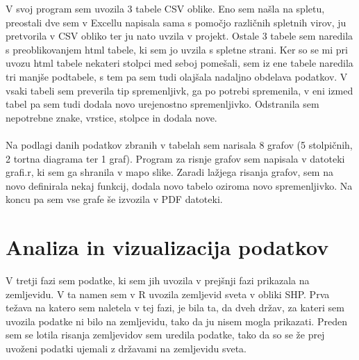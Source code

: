 \documentclass[11pt,a4paper]{article}
\begin{document}
V svoj program sem uvozila 3 tabele CSV oblike. Eno sem našla na spletu, preostali dve sem v Excellu napisala sama s pomočjo različnih spletnih virov, ju pretvorila v CSV obliko ter ju nato uvzila v projekt. Ostale 3 tabele sem naredila s preoblikovanjem html tabele, ki sem jo uvzila s spletne strani. Ker so se mi pri uvozu html tabele nekateri stolpci med seboj pomešali, sem iz ene tabele naredila tri manjše podtabele, s tem pa sem tudi olajšala nadaljno obdelava podatkov. V vsaki tabeli sem preverila tip spremenljivk, ga po potrebi spremenila, v eni izmed tabel pa sem tudi dodala novo urejenostno spremenljivko. Odstranila sem nepotrebne znake, vrstice, stolpce in dodala nove. \\
\\
Na podlagi danih podatkov zbranih v tabelah sem narisala 8 grafov (5 stolpičnih, 2 tortna diagrama ter 1 graf).
Program za risnje grafov sem napisala v datoteki grafi.r, ki sem ga shranila v mapo slike. Zaradi lažjega risanja grafov, sem na novo definirala nekaj funkcij, dodala novo tabelo oziroma novo spremenljivko.
Na koncu pa sem vse grafe še izvozila v PDF datoteki.



\newpage

\section{Analiza in vizualizacija podatkov}

V tretji fazi sem podatke, ki sem jih uvozila v prejšnji fazi prikazala na zemljevidu.
V ta namen sem v R uvozila zemljevid sveta v obliki SHP.
Prva težava na katero sem naletela v tej fazi, je bila ta, da dveh držav, za kateri sem uvozila podatke ni bilo na zemljevidu, tako da ju nisem mogla prikazati. 
Preden sem se lotila risanja zemljevidov sem uredila podatke, tako da so se že prej uvoženi podatki ujemali z državami na zemljevidu sveta.\\
\\
\end{document}
